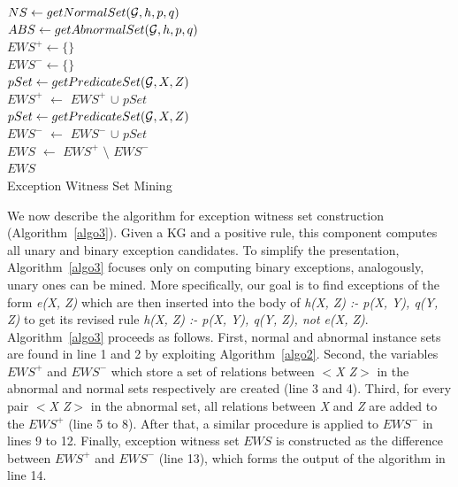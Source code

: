 \IncMargin{1.5em}
\begin{algorithm}[h]
\DontPrintSemicolon
\SetAlgoLined
{}
\BlankLine
$NS \leftarrow getNormalSet(\mathcal{G}, h, p, q)$\\
$ABS \leftarrow getAbnormalSet(\mathcal{G}, h, p, q)$\\
$EWS^+ \leftarrow \{\}$\\
$EWS^- \leftarrow \{\}$\\
\BlankLine
{} {
	$pSet \leftarrow getPredicateSet(\mathcal{G}, X, Z)$\\
	$EWS^+$ $\leftarrow$ $EWS^+$ $\cup$ $pSet$\\
}
 {
	$pSet \leftarrow getPredicateSet(\mathcal{G}, X, Z)$\\
	$EWS^-$ $\leftarrow$ $EWS^-$ $\cup$ $pSet$\\
}
$EWS$ $\leftarrow$ $EWS^+$ $\setminus$ $EWS^-$\\
\Return $EWS$\\
\caption{Exception Witness Set Mining}
\label{algo3}
\end{algorithm}
\DecMargin{1.5em}

We now describe the algorithm for exception witness set construction (Algorithm~\ref{algo3}). Given a KG and a positive rule, this component computes all unary and binary exception candidates. To simplify the presentation, Algorithm~\ref{algo3} focuses only on computing binary exceptions, analogously, unary ones can be mined. More specifically, our goal is to find exceptions of the form \textit{e(X, Z)} which are then inserted into the body of \textit{h(X, Z) :- p(X, Y), q(Y, Z)} to get its revised rule \textit{h(X, Z) :- p(X, Y), q(Y, Z), not e(X, Z)}. Algorithm~\ref{algo3} proceeds as follows. First, normal and abnormal instance sets are found in line 1 and 2 by exploiting Algorithm~\ref{algo2}. Second, the variables $EWS^+$ and $EWS^-$ which store a set of relations between \textit{$<$X Z$>$} in the abnormal and normal sets respectively are created (line 3 and 4). Third, for every pair \textit{$<$X Z$>$} in the abnormal set, all relations between \textit{X} and \textit{Z} are added to the $EWS^+$ (line 5 to 8). After that, a similar procedure is applied to $EWS^-$ in lines 9 to 12. Finally, exception witness set $EWS$ is constructed as the difference between $EWS^+$ and $EWS^-$ (line 13), which forms the output of the algorithm in line 14.

